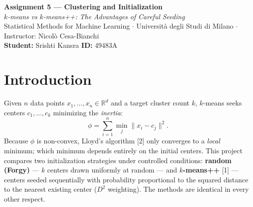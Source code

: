 \documentclass[11pt,a4paper]{article}
\newcommand{\Rbb}{\mathbb{R}}
\newcommand{\norm}[1]{\lVert #1 \rVert}
\begin{document}

\begin{center}
  {\LARGE\bfseries Assignment 5 — Clustering and Initialization}\\[4pt]
  {\large\itshape $k$-means vs $k$-means++: The Advantages of Careful Seeding}\\[8pt]
  {\small Statistical Methods for Machine Learning $\cdot$
   Università degli Studi di Milano $\cdot$
   Instructor: Nicolò Cesa-Bianchi}\\[4pt]
  {\small\textbf{Student:} Srishti Kansra \quad \textbf{ID:} 49483A }
\end{center}

\smallskip
\noindent{}
\vspace{4pt}

\section{Introduction}

Given $n$ data points $x_1,\ldots,x_n\!\in\!\Rbb^d$ and a target cluster count $k$,
$k$-means seeks centers $c_1,\ldots,c_k$ minimizing the \emph{inertia}:
\begin{equation}
  \phi = \sum_{i=1}^{n}\min_{j}\norm{x_i-c_j}^2. \label{eq:inertia}
\end{equation}
Because $\phi$ is non-convex, Lloyd's algorithm [2] only converges to a
\emph{local} minimum; which minimum depends entirely on the initial centers.
This project compares two initialization strategies under controlled conditions:
\textbf{random (Forgy)} — $k$ centers drawn uniformly at random — and
\textbf{$k$-means++} [1] — centers seeded sequentially with
probability proportional to the squared distance to the nearest existing center ($D^2$
weighting). The methods are identical in every other respect.
\end{document}
